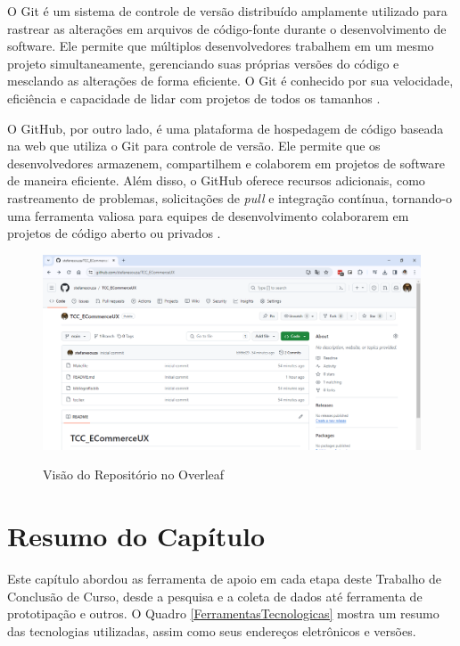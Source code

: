 O Git é um sistema de controle de versão distribuído amplamente utilizado para rastrear as alterações em arquivos de código-fonte durante o desenvolvimento de software. Ele permite que múltiplos desenvolvedores trabalhem em um mesmo projeto simultaneamente, gerenciando suas próprias versões do código e mesclando as alterações de forma eficiente. O Git é conhecido por sua velocidade, eficiência e capacidade de lidar com projetos de todos os tamanhos \cite{Git}.

O GitHub, por outro lado, é uma plataforma de hospedagem de código baseada na web que utiliza o Git para controle de versão. Ele permite que os desenvolvedores armazenem, compartilhem e colaborem em projetos de software de maneira eficiente. Além disso, o GitHub oferece recursos adicionais, como rastreamento de problemas, solicitações de \textit{pull} e integração contínua, tornando-o uma ferramenta valiosa para equipes de desenvolvimento colaborarem em projetos de código aberto ou privados \cite{GitHub}.

\begin{figure}[ht]
    \centering
    \caption{Visão do Repositório no Overleaf}
    \includegraphics[keepaspectratio=true,scale=0.4]{figuras/cap03github.png}
    \label{fig06}
\end{figure}


\section{Resumo do Capítulo} 
    \label{resumo}

Este capítulo abordou as ferramenta de apoio em cada etapa deste Trabalho de Conclusão de Curso, desde a pesquisa e a coleta de dados até ferramenta de prototipação e outros. O Quadro \ref{FerramentasTecnologicas} mostra um resumo das tecnologias utilizadas, assim como seus endereços eletrônicos e versões.

